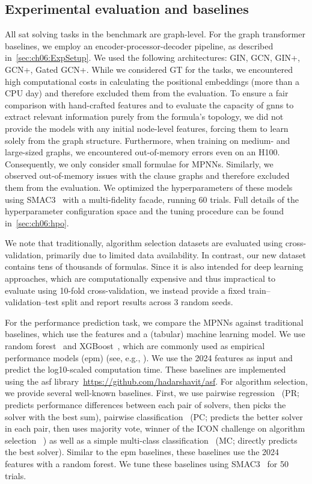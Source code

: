 \subsection{Experimental evaluation and baselines}
All \gls{sat} solving tasks in the benchmark are graph-level. For the graph transformer baselines, we employ an encoder-processor-decoder pipeline, as described in~\cref{sec:ch06:ExpSetup}. We used the following architectures: GIN, GCN, GIN+, GCN+, Gated GCN+. While we considered GT for the tasks, we encountered high computational costs in calculating the positional embeddings (more than a CPU day) and therefore excluded them from the evaluation. To ensure a fair comparison with hand-crafted features and to evaluate the capacity of \glspl{gnn} to extract relevant information purely from the formula's topology, we did not provide the models with any initial node-level features, forcing them to learn solely from the graph structure. Furthermore, when training on medium- and large-sized graphs, we encountered out-of-memory errors even on an H100. Consequently, we only consider small formulae for MPNNs. Similarly, we observed out-of-memory issues with the clause graphs and therefore excluded them from the evaluation. We optimized the hyperparameters of these models using SMAC3~\citep{LinEtAl22b} with a multi-fidelity facade, running 60 trials. Full details of the hyperparameter configuration space and the tuning procedure can be found in~\cref{sec:ch06:hpo}.

We note that traditionally, algorithm selection datasets are evaluated using cross-validation, primarily due to limited data availability. In contrast, our new dataset contains tens of thousands of formulas. Since it is also intended for deep learning approaches, which are computationally expensive and thus impractical to evaluate using 10-fold cross-validation, we instead provide a fixed train–validation–test split and report results across 3 random seeds.

For the performance prediction task, we compare the MPNNs against traditional baselines, which use the  features and a (tabular) machine learning model. We use random forest~\citep{Breiman01b} and XGBoost~\citep{CheGue16b}, which are commonly used as empirical performance models (\gls{epm}) (see, e.g., \citet{BanEtAl22b,EggEtAl15b,HutEtAl14c}).
We use the  2024 features as input and predict the log10-scaled computation time. These baselines are implemented using the \gls{asf} library~\url{https://github.com/hadarshavit/asf}.
For algorithm selection, we provide several well-known baselines. First, we use pairwise regression~\citep{KerEtAl18b} (PR; predicts performance differences between each pair of solvers, then picks the solver with the best sum), pairwise classification~\citep{XuEtAl12b} (PC; predicts the better solver in each pair, then uses majority vote,
winner of the ICON challenge on algorithm selection~\citep{LinEtAl19c}
) as well as a simple multi-class classification~\citep{Kotthoff13b} (MC; directly predicts the best solver). Similar to the \gls{epm} baselines, these baselines use the  2024 features with a random forest. We tune these baselines using SMAC3~\citep{LinEtAl22b} for 50 trials.


